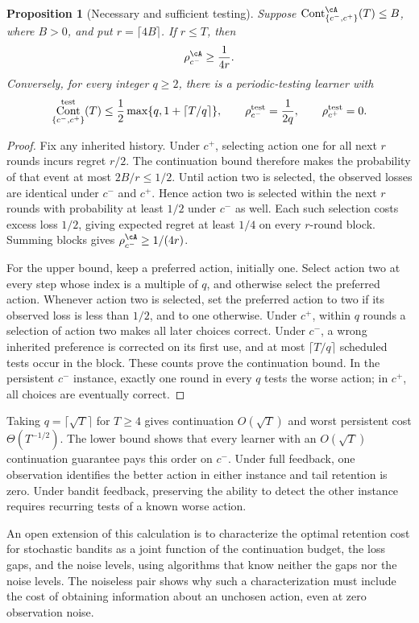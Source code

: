 \documentclass[11pt,twoside]{article}
\newtheorem{proposition}[theorem]{Proposition}
\theoremstyle{definition}
\theoremstyle{remark}
\DeclareMathOperator{\Cont}{Cont}
\begin{document}
\begin{proposition}[Necessary and sufficient testing]
\label{ex:bandit-pair}
Suppose $\Cont_{\{c^-,c^+\}}^\cA(T)\le B$, where $B>0$, and put
$r=\lceil4B\rceil$. If $r\le T$, then
\[
 \rho_{c^-}^\cA\ge\frac1{4r}.
\]
Conversely, for every integer $q\ge2$, there is a periodic-testing learner
with
\[
 \Cont_{\{c^-,c^+\}}^{\rm test}(T)
 \le\frac12\max\{q,1+\lceil T/q\rceil\},\qquad
 \rho_{c^-}^{\rm test}=\frac1{2q},\qquad \rho_{c^+}^{\rm test}=0.
\]
\end{proposition}
\begin{proof}
Fix any inherited history. Under $c^+$, selecting action one for all next
$r$ rounds incurs regret $r/2$. The continuation bound therefore makes the
probability of that event at most $2B/r\le1/2$. Until action two is
selected, the observed losses are identical under $c^-$ and $c^+$.
Hence action two is selected within the next $r$ rounds with probability
at least $1/2$ under $c^-$ as well. Each such selection costs excess loss
$1/2$, giving expected regret at least $1/4$ on every $r$-round block.
Summing blocks gives $\rho_{c^-}^\cA\ge1/(4r)$.

For the upper bound, keep a preferred action, initially one. Select action
two at every step whose index is a multiple of $q$, and otherwise select
the preferred action. Whenever action two is selected, set the preferred
action to two if its observed loss is less than $1/2$, and to one otherwise.
Under $c^+$, within $q$ rounds a selection of action two makes all later
choices correct. Under $c^-$, a wrong inherited preference is corrected
on its first use, and at most $\lceil T/q\rceil$ scheduled tests occur
in the block. These counts prove the continuation bound. In the persistent
$c^-$ instance, exactly one round in every $q$ tests the worse action;
in $c^+$, all choices are eventually correct.
\end{proof}

Taking $q=\lceil\sqrt T\rceil$ for $T\ge4$ gives continuation
$O(\sqrt T)$ and worst persistent cost $\Theta(T^{-1/2})$.
The lower bound shows that every learner with an $O(\sqrt T)$
continuation guarantee pays this order on $c^-$. Under full feedback,
one observation identifies the better action in either instance and tail
retention is zero. Under bandit feedback, preserving the ability to detect
the other instance requires recurring tests of a known worse action.

An open extension of this calculation is to characterize the optimal
retention cost for stochastic bandits as a joint function of the
continuation budget, the loss gaps, and the noise levels, using algorithms
that know neither the gaps nor the noise levels. The noiseless pair shows
why such a characterization must include the cost of obtaining information
about an unchosen action, even at zero observation noise.
\end{document}

